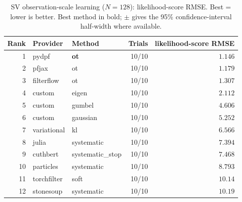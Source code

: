 \begin{table}[!htbp]
\centering
\small
\caption{SV observation-scale learning ($N=128$): likelihood-score RMSE. Best = lower is better. Best method in bold; $\pm$ gives the 95\% confidence-interval half-width where available.}
\label{tab:sv-observation-scale-learning-score-rmse}
\begin{tabular}{rllrr}
\toprule
Rank & Provider & Method & Trials & likelihood-score RMSE \\
\midrule
1 & pydpf & \textbf{ot} & 10/10 & $\mathbf{1.146}$ \\
2 & pfjax & ot & 10/10 & $1.179$ \\
3 & filterflow & ot & 10/10 & $1.307$ \\
4 & custom & eigen & 10/10 & $2.112$ \\
5 & custom & gumbel & 10/10 & $4.606$ \\
6 & custom & gaussian & 10/10 & $5.252$ \\
7 & variational & kl & 10/10 & $6.566$ \\
8 & julia & systematic & 10/10 & $7.394$ \\
9 & cuthbert & systematic\_stop & 10/10 & $7.468$ \\
10 & particles & systematic & 10/10 & $8.793$ \\
11 & torchfilter & soft & 10/10 & $10.14$ \\
12 & stonesoup & systematic & 10/10 & $10.19$ \\
\bottomrule
\end{tabular}
\end{table}
